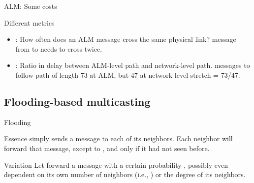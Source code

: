 \begin{slide}{ALM: Some costs}
  \begin{block}{Different metrics}
    \begin{center}
    \end{center}
    \begin{itemize}\tightlist
    \item {}: How often does an ALM message cross the same physical link? 
      message from  to  needs to cross  twice.
    \item {}: Ratio in delay between ALM-level path and network-level path. 
      messages  to  follow path of length 73 at ALM, but 47 at network level
      \mathexpr{\Rightarrow} stretch = 73/47.
    \end{itemize}
  \end{block}
\end{slide}
\subsection{Flooding-based multicasting}
\begin{slide}{Flooding}
  \begin{block}{Essence}
     simply sends a message  to each of its neighbors. Each neighbor will forward that
    message, except to , and only if it had not seen  before.
  \end{block}
  \begin{centerfig}
  \end{centerfig}
  \begin{block}{Variation}
    Let  forward a message with a certain probability , possibly even dependent
    on its own number of neighbors (i.e., ) or the degree of its neighbors.
  \end{block}
\end{slide}
